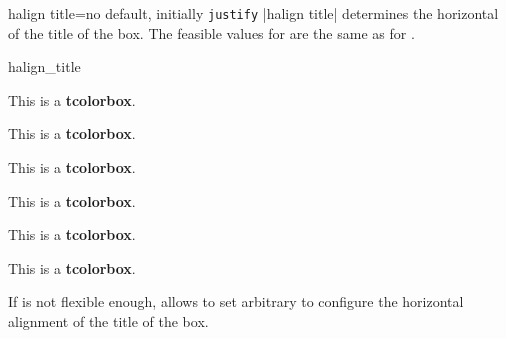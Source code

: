 \clearpage
\begin{docTcbKey}[][doc new=2015-05-07]{halign title}{=}{no default, initially \texttt{justify}}
  |halign title| determines the horizontal  of the title of the box.
  The feasible values for  are the same as for .

\begin{exdispExample}{halign_title}
\begin{tcbraster}[raster columns=3,fonttitle=\bfseries,
  colback=red!5!white,colframe=red!75!black]

  \begin{tcolorbox}[adjusted title=flush center,halign title=flush center]
    This is a \textbf{tcolorbox}.
  \end{tcolorbox}
  \begin{tcolorbox}[adjusted title=flush left,halign title=flush left]
    This is a \textbf{tcolorbox}.
  \end{tcolorbox}
  \begin{tcolorbox}[adjusted title=flush right,halign title=flush right]
    This is a \textbf{tcolorbox}.
  \end{tcolorbox}
  \begin{tcolorbox}[adjusted title=center,halign title=center]
    This is a \textbf{tcolorbox}.
  \end{tcolorbox}
  \begin{tcolorbox}[adjusted title=left,halign title=left]
    This is a \textbf{tcolorbox}.
  \end{tcolorbox}
  \begin{tcolorbox}[adjusted title=right,halign title=right]
    This is a \textbf{tcolorbox}.
  \end{tcolorbox}

\end{tcbraster}
\end{exdispExample}
\end{docTcbKey}


\begin{docTcbKeys}[
    doc parameter   = {=\marg{code}},
    doc description = {no default},
    doc new         = 2022-07-07,
    doc name        = halign title code,
  ]{}
  If  is not flexible enough,
   allows to set
  arbitrary  to configure the horizontal alignment of the title
  of the box.
\end{docTcbKeys}



